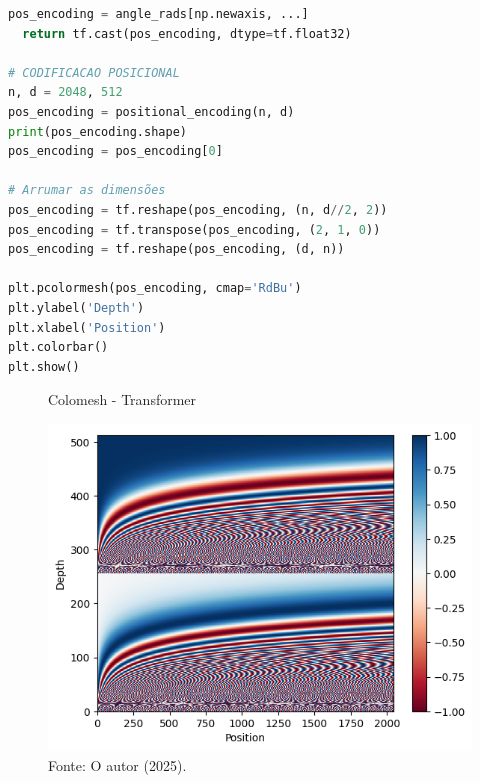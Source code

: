 \begin{lstlisting}[language=Python, style=input]
  pos_encoding = angle_rads[np.newaxis, ...]
  return tf.cast(pos_encoding, dtype=tf.float32)

# CODIFICACAO POSICIONAL
n, d = 2048, 512
pos_encoding = positional_encoding(n, d)
print(pos_encoding.shape)
pos_encoding = pos_encoding[0]

# Arrumar as dimensões
pos_encoding = tf.reshape(pos_encoding, (n, d//2, 2))
pos_encoding = tf.transpose(pos_encoding, (2, 1, 0))
pos_encoding = tf.reshape(pos_encoding, (d, n))

plt.pcolormesh(pos_encoding, cmap='RdBu')
plt.ylabel('Depth')
plt.xlabel('Position')
plt.colorbar()
plt.show()
\end{lstlisting}


\begin{figure}[H]
\centering
\caption{Colomesh - Transformer}
\includegraphics[width=.7\linewidth]{apendices/fig/9_IAA009_9.png}
\caption*{Fonte: O autor (2025).}
\end{figure}


